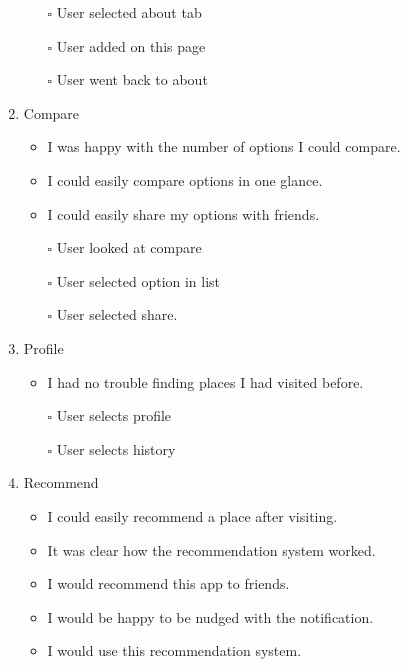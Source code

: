 \documentclass[a4 paper, 10pt]{article}
\begin{document}
\begin{multicols}{2}
\begin{enumerate}
\begin{itemize}
                    \item[$\square$] User selected about tab
                    \item[$\square$] User added on this page
                    \item[$\square$] User went back to about
                \end{itemize}
            \item Compare
                \begin{itemize}
                    \item I was happy with the number of options I could compare.
                    \item I could easily compare options in one glance.
                    \item I could easily share my options with friends.
                    
                    \item[$\square$] User looked at compare
                    \item[$\square$] User selected option in list
                    \item[$\square$] User selected share.
                \end{itemize}

            \item Profile
                \begin{itemize}
                    \item I had no trouble finding places I had visited before.
                    
                    \item[$\square$] User selects profile
                    \item[$\square$] User selects history
                \end{itemize}
            \item Recommend
                \begin{itemize}
                    \item I could easily recommend a place after visiting.
                    \item It was clear how the recommendation system worked.
                    \item I would recommend this app to friends.
                    \item I would be happy to be nudged with the notification.
                    \item I would use this recommendation system.
                    

\end{itemize}
\end{enumerate}
\end{multicols}
\end{document}
